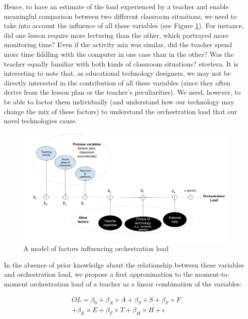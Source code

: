 \documentclass[10pt,journal,compsoc]{IEEEtran}
\begin{document}
Hence, to have an estimate of the load experienced by a teacher and enable meaningful comparison between two different classroom situations, we need to take into account the influence of all these variables (see Figure \ref{fig:model}). For instance, did one lesson require more lecturing than the other, which portrayed more monitoring time? Even if the activity mix was similar, did the teacher spend more time fiddling with the computer in one case than in the other? Was the teacher equally familiar with both kinds of classroom situations? etcetera. It is interesting to note that, as educational technology designers, we may not be directly interested in the contribution of all these variables (since they often derive from the lesson plan or the teacher's peculiarities). We need, however, to be able to factor them individually (and understand how our technology may change the mix of these factors) to understand the orchestration load that our novel technologies cause.


\begin{figure}[!t]
\centering
\includegraphics[width=\linewidth]{img/ModelFactorsOL}
\caption{A model of factors influencing orchestration load}
\label{fig:model}
\end{figure}

In the absence of prior knowledge about the relationship between these variables and orchestration load, we propose a first approximation to the moment-to-moment orchestration load of a teacher as a linear combination of the variables:

\begin{multline}
\label{formOLScat}
OL = \beta_0 + \beta_A\times{}A + \beta_S\times{}S + \beta_F\times{}F \\ + \beta_E\times{}E + \beta_T\times{}T + \beta_H\times{}H + \epsilon
\end{multline}
\end{document}
